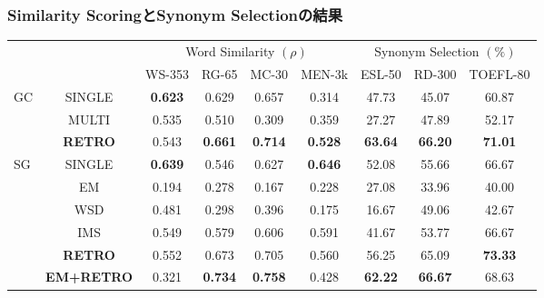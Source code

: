 \documentclass[10pt,usepdftitle=false,hyperref={unicode}]{beamer}
\begin{document}
\begin{frame}
\frametitle{Similarity ScoringとSynonym Selectionの結果}
\begin{algfont}
    {\renewcommand{\arraystretch}{1.5}
        {\scriptsize
\begin{tabular}{cc|cccc|ccc|}
    \cline{3-9}
    & \multicolumn{1}{l|}{} & \multicolumn{4}{c|}{Word Similarity $(\rho)$} & \multicolumn{3}{c|}{Synonym Selection $(\%)$} \\
                                          &                      & WS-353    & RG-65    & MC-30   & MEN-3k   & ESL-50     & RD-300     & TOEFL-80    \\
\hline
\multicolumn{1}{|l|}{\multirow{3}{*}{GC}}
                        & SINGLE            & \textbf{0.623} & 0.629          & 0.657          & 0.314          & 47.73          & 45.07          & 60.87          \\
\multicolumn{1}{|l|}{}  & MULTI             & 0.535          & 0.510          & 0.309          & 0.359          & 27.27          & 47.89          & 52.17          \\
\multicolumn{1}{|l|}{}  & \textbf{RETRO}    & 0.543          & \textbf{0.661} & \textbf{0.714} & \textbf{0.528} & \textbf{63.64} & \textbf{66.20} & \textbf{71.01} \\
\hline
\multicolumn{1}{|l|}{\multirow{6}{*}{SG}}
                        & SINGLE            & \textbf{0.639} & 0.546          & 0.627          & \textbf{0.646} & 52.08          & 55.66          & 66.67          \\
\multicolumn{1}{|l|}{}  & EM                & 0.194          & 0.278          & 0.167          & 0.228          & 27.08          & 33.96          & 40.00          \\
\multicolumn{1}{|l|}{}  & WSD               & 0.481          & 0.298          & 0.396          & 0.175          & 16.67          & 49.06          & 42.67          \\
\multicolumn{1}{|l|}{}  & IMS               & 0.549          & 0.579          & 0.606          & 0.591          & 41.67          & 53.77          & 66.67          \\
\multicolumn{1}{|l|}{}  & \textbf{RETRO}    & 0.552          & 0.673          & 0.705          & 0.560          & 56.25          & 65.09          & \textbf{73.33} \\
\multicolumn{1}{|l|}{}  & \textbf{EM+RETRO} & 0.321          & \textbf{0.734} & \textbf{0.758} & 0.428          & \textbf{62.22} & \textbf{66.67} & 68.63          \\
\hline
\end{tabular}
        }
    }
\end{algfont}
\end{frame}
\end{document}
